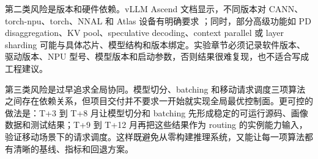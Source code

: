 第二类风险是版本和硬件依赖。vLLM Ascend 文档显示，不同版本对 CANN、torch-npu、torch、NNAL 和 Atlas 设备有明确要求 ；同时，部分高级功能如 PD disaggregation、KV pool、speculative decoding、context parallel 或 layer sharding 可能与具体芯片、模型结构和版本绑定。实验章节必须记录软件版本、驱动版本、NPU 型号、模型版本和启动参数，否则结果很难复现，也不适合写成工程建议。

第三类风险是过早追求全局协同。模型切分、batching 和移动请求调度三项算法之间存在依赖关系，但项目交付并不要求一开始就实现全局最优控制面。更可控的做法是：T+3 到 T+8 月让模型切分和 batching 先形成稳定的可运行源码、画像数据和测试结果；T+9 到 T+12 月再把这些结果作为 routing 的实例能力输入，验证移动场景下的请求调度。这样既避免从零构建推理系统，又能让每一项算法都有清晰的基线、指标和回退方案。


